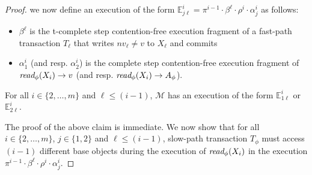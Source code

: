\begin{proof}
we now define an execution of the form  $\mathbb{E}_{j\ell}^{i}=\pi^{i-1}\cdot \beta^{\ell}\cdot \rho^i \cdot \alpha_j^i$
as follows:
%
\begin{itemize}
\item
$\beta^{\ell}$ is the t-complete step contention-free execution fragment of a fast-path transaction $T_{\ell}$
that writes $nv_{\ell}\neq v$ to $X_{\ell}$ and commits
\item
$\alpha_1^i$ (and resp. $\alpha_2^i$) is the complete step contention-free execution fragment of 
$\textit{read}_{\phi}(X_i) \rightarrow v$ (and resp. $\textit{read}_{\phi}(X_i) \rightarrow A_{\phi}$).
\end{itemize}
%
\begin{claim}
\label{cl:ic2}
For all $i\in \{2,\ldots, m\}$ and $\ell \leq (i-1)$, $\mathcal{M}$ has an execution of the form $\mathbb{E}_{1\ell}^{i}$ or 
$\mathbb{E}_{2\ell}^{i}$.
\end{claim}
%
The proof of the above claim is immediate.
% 
% 
%
%
We now show that for all $i\in \{2,\ldots, m\}$, $j\in \{1,2\}$ and $\ell \leq (i-1)$, slow-path transaction $T_{\phi}$ must access
$(i-1)$ different base objects during the execution of $\textit{read}_{\phi}(X_i)$ in the execution
$\pi^{i-1}\cdot \beta^{\ell}\cdot \rho^i \cdot \alpha_j^i$.


\end{proof}
